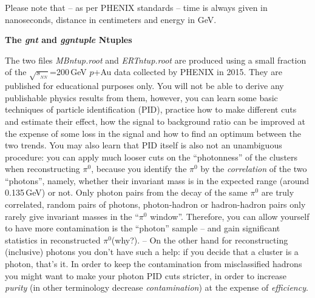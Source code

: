 \documentclass[12pt,letterpaper,aps,prc,superscriptaddress,showpacs,
longbibliography,nofootinbib,floatfix,onecolumn]{revtex4-1}
\newcommand{\sqsn}{\mbox{$\sqrt{s_{_{NN}}}$}\xspace}
\newcommand{\piz}{\mbox{$\pi^0$}\xspace}
\newcommand{\gev}{\mbox{GeV}\xspace}
\begin{document}
Please note that -- as per PHENIX standards -- time is always given in
nanoseconds, distance in centimeters and energy in GeV.


\vspace{0.1in}
{\bf The {\it gnt} and {\it ggntuple} Ntuples} \\
\vspace{0.05in}

\noindent
The two files {\it MBntup.root} and {\it ERTntup.root} are produced
using a small fraction of the \sqsn=200\,GeV $p$+Au data collected by
PHENIX in 2015.  They are published for educational purposes only.
You will not be able to derive any publishable physics results from
them, however, you can learn some basic techniques of
particle identification (PID), practice how to make different cuts and
estimate their effect, how the signal to background ratio can be
improved at the expense of some loss in the signal and how to find an
optimum between the two trends.  You may also learn that PID itself is
also not an unambiguous procedure: you can apply much looser cuts on
the ``photonness'' of the clusters when reconstructing \piz, because
you identify the \piz by the {\it correlation} of the two ``photons'',
namely, whether their invariant mass is in the expected range (around
0.135\,\gev) or not.  Only photon pairs from the decay of the same
\piz are truly correlated, random pairs of photons, photon-hadron or
hadron-hadron pairs only rarely give invariant masses in the 
``\piz window''.  Therefore, you can allow yourself to have more
contamination is the ``photon'' sample -- and gain significant
statistics in reconstructed \piz (why?).  --  On the other hand for
reconstructing (inclusive) photons you don't have such a help: if you
decide that a cluster is a photon, that's it.  In order to keep the
contamination from misclassified hadrons you might want to make your
photon PID cuts stricter, in order to increase {\it purity} 
(in other terminology decrease {\it contamination}) at the
expense of {\it efficiency}.
\end{document}
